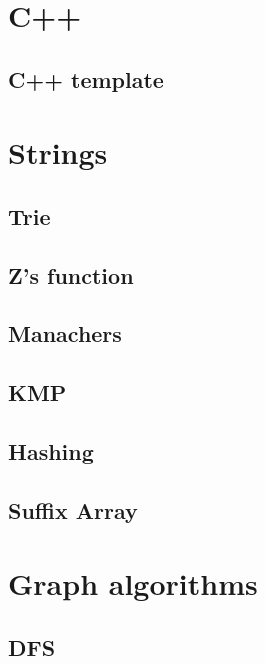 \section{C++}
\subsection{C++ template}
\raggedbottom
\hrulefill

\section{Strings}
\subsection{Trie}
\raggedbottom
\hrulefill
\subsection{Z's function}
\raggedbottom
\hrulefill
\subsection{Manachers}
\raggedbottom
\hrulefill
\subsection{KMP}
\raggedbottom
\hrulefill
\subsection{Hashing}
\raggedbottom
\hrulefill
\subsection{Suffix Array}
\raggedbottom
\hrulefill

\section{Graph algorithms}
\subsection{DFS}
\raggedbottom
\hrulefill
